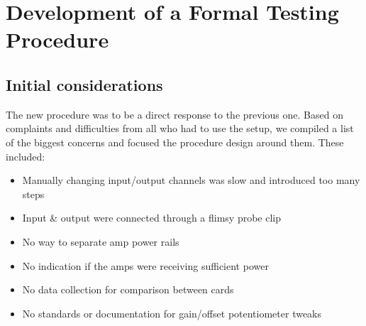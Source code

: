 %
%
\chapter{Development of a Formal Testing Procedure}
\section{Initial considerations}
The new procedure was to be a direct response to the previous one. Based on complaints and difficulties from all who had to use the setup, we compiled a list of the biggest concerns and focused the procedure design around them. These included:
\begin{itemize}
	\item Manually changing input/output channels was slow and introduced too many steps
	\item Input \& output were connected through a flimsy probe clip
	\item No way to separate amp power rails
	\item No indication if the amps were receiving sufficient power
	\item No data collection for comparison between cards
	\item No standards or documentation for gain/offset potentiometer tweaks
\end{itemize}